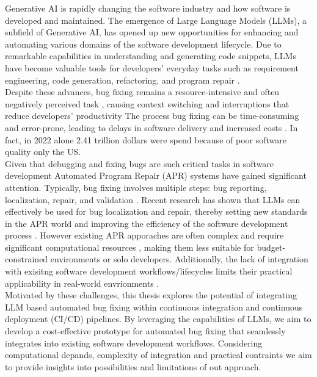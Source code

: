 Generative AI is rapidly changing the software industry and how software is developed and maintained. The emergence of Large Language Models (LLMs), a subfield of Generative AI, has opened up new opportunities for enhancing and automating various domains of the software development lifecycle. Due to remarkable capabilities in understanding and generating code snippets, LLMs have become valuable tools for developers' everyday tasks such as requirement engineering, code generation, refactoring, and program repair \cite{houLargeLanguageModels2024, puvvadiCodingAgentsComprehensive2025}.
\\
Despite these advances, bug fixing remains a resource-intensive and often negatively perceived task \cite{winterHowDevelopersReally2023}, causing context switching and interruptions that reduce developers' productivity \cite{vasilescuSkyNotLimit2016}
The process bug fixing can be time-consuming and error-prone, leading to delays in software delivery and increased costs \cite{}. In fact, in 2022 alone
2.41 trillion dollars were spend because of poor software quality only the US\cite{CostPoorSoftware}. %
\\
Given that debugging and fixing bugs are such critical tasks in software development Automated Program Repair (APR) systems have gained significant attention. 
Typically, bug fixing involves multiple steps: bug reporting, localization, repair, and validation \cite{zhangEmpiricalStudyFactors2012, leeUnifiedDebuggingApproach2024,xiaAgentlessDemystifyingLLMbased2024,zhangPATCHEmpoweringLarge2025, wangEmpiricalResearchUtilizing2025}.
Recent research has shown that LLMs can effectively be used for bug localization and repair, thereby setting new standards in the APR world and improving the efficiency of the software development process \cite{xiaAgentlessDemystifyingLLMbased2024,liuMarsCodeAgentAInative2024,yangSWEagentAgentComputerInterfaces2024, sobaniaAnalysisAutomaticBug2023, xiaAutomatedProgramRepair2024, huCanGPTO1Kill2024}.
However existing APR apporaches are often complex and require significant computational resources \cite{rondonEvaluatingAgentbasedProgram2025, }, making them less suitable for budget-constrained environments or solo developers. Additionally, the lack of integration with exisitng software development workflows/lifecycles limits their practical applicability in real-world envrionments \cite{chenUnveilingPitfallsUnderstanding2025,liuMarsCodeAgentAInative2024}.
\\
Motivated by these challenges, this thesis explores the potential of integrating LLM based automated bug fixing within continuous integration and continuous deployment (CI/CD) pipelines. By leveraging the capabilities of LLMs, we aim to develop a cost-effective prototype for automated bug fixing that seamlessly integrates into existing software development workflows. Considering computational depands, complexity of integration and practical contraints we aim to provide insights into possibilities and limitations of out approach.




